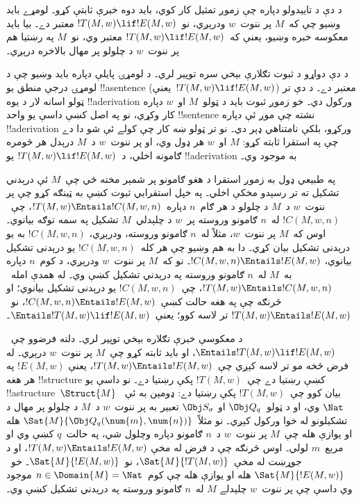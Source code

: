 \documentclass[../../../include/open-logic-section]{subfiles}
\begin{document}

\begin{explain}
د دې د تاييدولو دپاره چې زموږ تمثيل کار کوي، بايد دوه خبرې ثابتې
کړو۔ لومړے بايد وښيو چې که~$M$ پر ننوت~$w$ ودرېږي، نو~$!T(M, w)
\lif !E(M, w)$ معتبر دے۔ بيا بايد معکوسه خبره وښيو، يعنې که~$!T(M,
w) \lif !E(M, w)$ معتبر وي، نو~$M$ په رښتيا هم پر ننوت~$w$ د چلولو
پر مهال بالاخره درېږي۔

د دې دواړو د ثبوت تګلارې بېخي سره توپير لري۔ د لومړۍ پايلې دپاره
بايد وښيو چې د لومړۍ درجې منطق يو !!a{sentence} (يعنې~$!T(M, w)
\lif !E(M, w)$) معتبر دے۔ د دې تر ټولو اسانه لار د يوه
!!a{derivation} ورکول دي۔ خو زموږ ثبوت بايد د ټولو~$M$ او~$w$ دپاره
کار وکړي، نو په اصل کښې داسې يو واحد !!{sentence} نشته چې موږ ئې
دپاره !!a{derivation} ورکړو، بلکې نامتناهي ډېر دي۔ نو تر ټولو ښه کار
چې کولے ئې شو دا دے چې په استقرا ثابته کړو: $M$ او~$w$ هر ډول وي، او
پر ننوت~$w$ د~$M$ درېدل هر څومره ګامونه اخلي، د~$!T(M, w) \lif
!E(M, w)$ يو !!a{derivation} به موجود وي۔

په طبيعي ډول به زموږ استقرا د هغو ګامونو پر شمېر مخته ځي چې~$M$ ئې
درېدني تشکيل ته تر رسېدو مخکې اخلي۔ په خپل استقرايي ثبوت کښې به ټينګه
کړو چې پر ننوت~$w$ د~$M$ د چلولو د هر ګام~$n$ دپاره~$!T(M, w)
\Entails !C(M, w, n)$، چې~$!C(M, w, n)$ له~$n$ ګامونو وروسته پر~$w$
د چلېدلي~$M$ تشکيل په سمه توګه بيانوي۔ اوس که~$M$ پر ننوت~$w$، مثلاً
له~$n$ ګامونو وروسته، ودرېږي، $!C(M, w, n)$ به يو درېدنی تشکيل بيان
کړي۔ دا به هم وښيو چې هر کله~$!C(M, w, n)$ يو درېدنی تشکيل بيانوي،
$!C(M, w, n) \Entails !E(M, w)$۔ نو که~$M$ پر ننوت~$w$ ودرېږي، د
کوم~$n$ دپاره به~$M$ له~$n$ ګامونو وروسته په درېدني تشکيل کښې وي۔
له همدې امله~$!T(M, w) \Entails !C(M, w, n)$، چې~$!C(M, w, n)$ يو
درېدنی تشکيل بيانوي؛ او څرنګه چې په هغه حالت کښې~$!C(M, w, n)
\Entails !E(M, w)$، نو~$!T(M, w) \Entails !E(M, w)$ تر لاسه کوو؛
يعنې~$\Entails !T(M, w) \lif !E(M, w)$۔

د معکوسې خبرې تګلاره بېخي توپير لري۔ دلته فرضوو چې~$\Entails !T(M,
w) \lif !E(M, w)$، او بايد ثابته کړو چې~$M$ پر ننوت~$w$ درېږي۔ له
فرض څخه مو تر لاسه کېږي چې~$!T(M, w) \Entails !E(M, w)$، يعنې
$!E(M, w)$ په هر هغه !!{structure} کښې رښتيا دے چې~$!T(M, w)$ پکې
رښتيا دے۔ نو داسې يو !!a{structure}~$\Struct{M}$ بيان کوو چې~$!T(M,
w)$ پکې رښتيا دے: ډومېن به ئې~$\Nat$ وي، او د ټولو~$\Obj Q_q$ او
$\Obj S_\sigma$ تعبير به پر ننوت~$w$ د~$M$ د چلولو پر مهال د تشکيلونو
له خوا ورکول کېږي۔ نو مثلاً~$\Sat{M}{\Obj Q_q(\num{m}, \num{n})}$
هله او يوازې هله چې~$M$ پر ننوت~$w$ د~$n$ ګامونو دپاره وچلول شي،
په حالت~$q$ کښې وي او مربع~$m$ لولي۔ اوس څرنګه چې د فرض له مخې
$!T(M, w) \Entails !E(M, w)$، او د جوړښت له مخې~$\Sat{M}{!T(M, w)}$،
نو~$\Sat{M}{!E(M, w)}$۔ خو~$\Sat{M}{!E(M, w)}$ هله او يوازې هله چې
کوم~$n \in \Domain{M} = \Nat$ موجود وي داسې چې پر ننوت~$w$ چلېدلے
$M$ له~$n$ ګامونو وروسته په درېدني تشکيل کښې وي۔
\end{explain}
\end{document}

